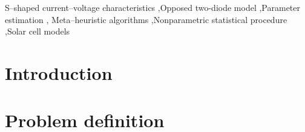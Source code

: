 \documentclass[a4paper,fleqn]{cas-dc}
\begin{document}
\begin{keywords}
S--shaped current--voltage characteristics \sep Opposed two-diode model \sep Parameter estimation \sep
Meta--heuristic algorithms \sep Nonparametric statistical procedure \sep Solar cell models
\end{keywords}

\maketitle

\section{Introduction}\label{Int}




\cite{NFL}


\section{Problem definition}\label{MM}
\end{document}
